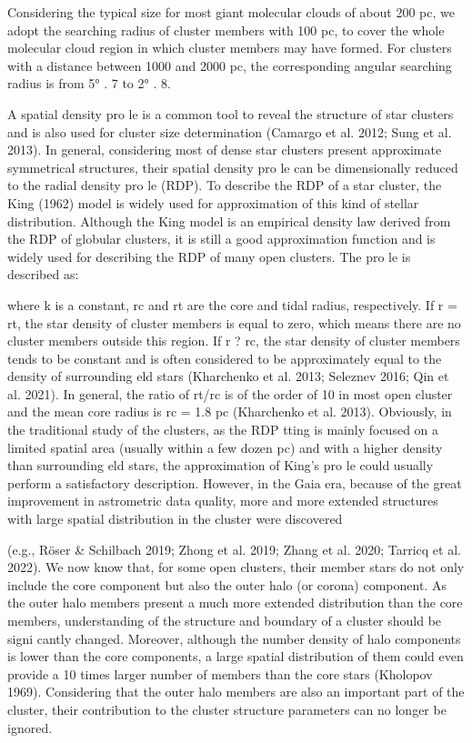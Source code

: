 \documentclass[../Main.tex]{subfiles}
\begin{document}
{Considering the
typical size for most giant molecular clouds of about 200 pc,
we adopt the searching radius of cluster members with 100 pc, to cover the whole molecular cloud region in which cluster
members may have formed. For clusters with a distance
between 1000 and 2000 pc, the corresponding angular
searching radius is from 5° . 7 to 2° . 8.


A spatial density pro le is a common tool to reveal the
structure of star clusters and is also used for cluster size
determination (Camargo et al. 2012; Sung et al. 2013). In
general, considering most of dense star clusters present
approximate symmetrical structures, their spatial density pro le
can be dimensionally reduced to the radial density pro le
(RDP). To describe the RDP of a star cluster, the King (1962)
model is widely used for approximation of this kind of stellar
distribution. Although the King model is an empirical density
law derived from the RDP of globular clusters, it is still a good
approximation function and is widely used for describing the
RDP of many open clusters. The pro le is described as:

where k is a constant, rc and rt are the core and tidal radius,
respectively. If r = rt, the star density of cluster members is
equal to zero, which means there are no cluster members
outside this region. If r ? rc, the star density of cluster
members tends to be constant and is often considered to be
approximately equal to the density of surrounding eld stars
(Kharchenko et al. 2013; Seleznev 2016; Qin et al. 2021). In
general, the ratio of rt/rc is of the order of 10 in most open
cluster and the mean core radius is rc
= 1.8 pc (Kharchenko
et al. 2013). Obviously, in the traditional study of the clusters,
as the RDP tting is mainly focused on a limited spatial area
(usually within a few dozen pc) and with a higher density than
surrounding eld stars, the approximation of King’s pro le
could usually perform a satisfactory description.
However, in the Gaia era, because of the great improvement
in astrometric data quality, more and more extended structures
with large spatial distribution in the cluster were discovered

(e.g., Röser & Schilbach 2019; Zhong et al. 2019; Zhang et al.
2020; Tarricq et al. 2022). We now know that, for some open
clusters, their member stars do not only include the core
component but also the outer halo (or corona) component. As
the outer halo members present a much more extended
distribution than the core members, understanding of the
structure and boundary of a cluster should be signi cantly
changed. Moreover, although the number density of halo
components is lower than the core components, a large spatial
distribution of them could even provide a 10 times larger
number of members than the core stars (Kholopov 1969).
Considering that the outer halo members are also an important
part of the cluster, their contribution to the cluster structure
parameters can no longer be ignored.

}
\end{document}
